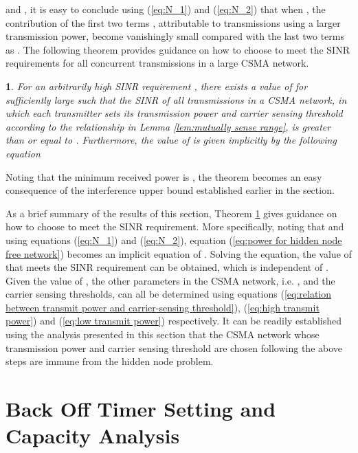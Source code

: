 \documentclass[english]{IEEEtran}
\theoremstyle{plain}
\newtheorem{thm}{\protect\theoremname}
\theoremstyle{plain}
\theoremstyle{plain}
\theoremstyle{remark}
\providecommand{\theoremname}{Theorem}
\begin{document}
and , it is easy to
conclude using (\ref{eq:N_1}) and (\ref{eq:N_2}) that when ,
the contribution of the first two terms ,
attributable to transmissions using a larger transmission power, become
vanishingly small compared with the last two terms as .
The following theorem provides guidance on how to choose 
to meet the SINR requirements for all concurrent transmissions in
a large CSMA network.
\begin{thm}
\label{thm:hidden node free}For an arbitrarily high SINR requirement
, there exists a value of  for sufficiently large
 such that the SINR of all transmissions in a CSMA network, in
which each transmitter sets its transmission power and carrier sensing
threshold according to the relationship in Lemma \ref{lem:mutually sense range},
is greater than or equal to . Furthermore, the value of 
is given implicitly by the following equation

\end{thm}
\begin{IEEEproof}
Noting that the minimum received power is , the theorem
becomes an easy consequence of the interference upper bound established
earlier in the section.
\end{IEEEproof}
As a brief summary of the results of this section, Theorem \ref{thm:hidden node free}
gives guidance on how to choose  to meet the SINR requirement.
More specifically, noting that 
and using equations (\ref{eq:N_1}) and (\ref{eq:N_2}), equation
(\ref{eq:power for hidden node free network}) becomes an implicit
equation of . Solving the equation, the value of 
that meets the SINR requirement can be obtained, which is independent
of . Given the value of , the other parameters in the
CSMA network, i.e. ,  and the carrier sensing thresholds,
can all be determined using equations (\ref{eq:relation between transmit power and carrier-sensing threshold}),
(\ref{eq:high transmit power}) and (\ref{eq:low transmit power})
respectively. It can be readily established using the analysis presented
in this section that the CSMA network whose transmission power and
carrier sensing threshold are chosen following the above steps are
immune from the hidden node problem.


\section{Back Off Timer Setting and Capacity Analysis\label{sec:Capacity-Analysis}}
\end{document}
